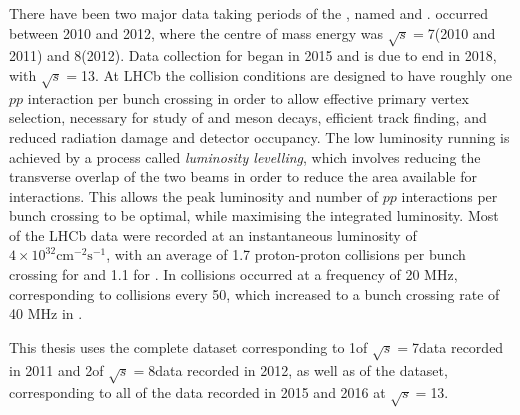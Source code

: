 There have been two major data taking periods of the \lhc, named \runone and \runtwo. \runone occurred between 2010 and 2012, where the centre of mass energy was $\sqrt{s}=$7\tev (2010 and 2011) and 8\tev (2012). Data collection for \runtwo began in 2015 and is due to end in 2018, with $\sqrt{s}=$13\tev. At LHCb the collision conditions are designed to have roughly one $pp$ interaction per bunch crossing in order to allow effective primary vertex selection, necessary for study of \B and \D meson decays, efficient track finding, and reduced radiation damage and detector occupancy. The low luminosity running is achieved by a process called {\it luminosity levelling}, which involves reducing the transverse overlap of the two beams in order to reduce the area available for interactions. This allows the peak luminosity and number of $pp$ interactions per bunch crossing to be optimal, while maximising the integrated luminosity. Most of the LHCb data were recorded at an instantaneous luminosity of $4 \times 10^{32}\text{cm}^{-2}\text{s}^{-1}$, with an average of 1.7 proton-proton collisions per bunch crossing for \runone and 1.1 for \runtwo. In \runone collisions occurred at a frequency of 20 MHz, corresponding to collisions every 50\ns, which increased to a bunch crossing rate of 40 MHz in \runtwo.

This thesis uses the complete \runonelumi \runone dataset corresponding to 1\invfb of $\sqrt{s}=$7\tev data recorded in 2011 and 2\invfb of $\sqrt{s}=$8\tev data recorded in 2012, as well as \runtwolumi of the \runtwo dataset, corresponding to all of the data recorded in 2015 and 2016 at $\sqrt{s}=$13\tev.

